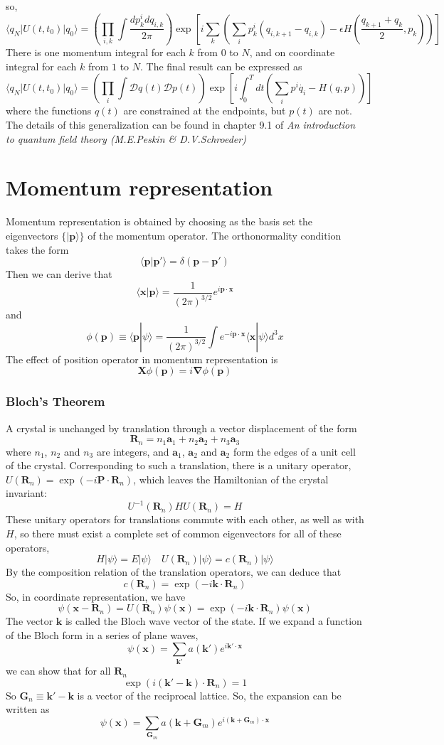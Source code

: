 so,
\[\langle q_{N} | U(t,t_0) | q_{0}\rangle = \left( \prod_{i,k} \int \frac{dp^i_k dq_{i,k}}{2\pi}\right) \exp \left[ i\sum_k \left( \sum_i p_k^i (q_{i,k+1} - q_{i,k})-\epsilon H \left( \frac{q_{k+1}+q_{k}}{2},p_k\right)\right) \right]\]
There is one momentum integral for each $k$ from $0$ to $N$, and on coordinate integral for each $k$ from $1$ to $N$.
The final result can be expressed as
\[\langle q_{N} | U(t,t_0) | q_{0}\rangle = \left( \prod_{i} \int \mathcal{D}q(t) \mathcal{D}p(t) \right) \exp \left[ i \int_0^T dt \left( \sum_i p^i \dot{q_i} - H \left( q,p\right)\right) \right]\]
where the functions $q(t)$ are constrained at the endpoints, but $p(t)$ are not. 
The details of this generalization can be found in  chapter 9.1 of \emph{An introduction to quantum field theory (M.E.Peskin \& D.V.Schroeder)}

\section{Momentum representation}
Momentum representation is obtained by choosing as the basis set the eigenvectors $\{|\bm{p}\rangle\}$ of the momentum operator. The orthonormality condition takes the form
\[\langle \bm{p} | \bm{p}' \rangle = \delta(\bm{p}-\bm{p}')\]
Then we can derive that
\[\langle \bm{x} | \bm{p} \rangle = \frac{1}{(2\pi)^{3/2}} e^{i\bm{p}\cdot\bm{x}}\]
and
\[\phi(\bm{p}) \equiv \langle \bm{p} | \psi \rangle = \frac{1}{(2\pi)^{3/2}} \int e^{-i\bm{p}\cdot\bm{x}} \langle \bm{x} | \psi \rangle d^3 x\]
The effect of position operator in momentum representation is
\[\bm{X}\phi(\bm{p}) = i\bm{\nabla} \phi(\bm{p})\]
\subsubsection{Bloch's Theorem}
A crystal is unchanged by translation through a vector displacement of the form
\[\bm{R}_n = n_1\bm{a}_1 + n_2\bm{a}_2 + n_3\bm{a}_3\]
where $n_1$, $n_2$ and $n_3$ are integers, and $\bm{a}_1$, $\bm{a}_2$ and $\bm{a}_2$ form the edges of a unit cell of the crystal. Corresponding to such a translation, there is a unitary operator, $U(\bm{R}_n) = \exp(-i\bm{P}\cdot \bm{R}_n)$, which leaves the Hamiltonian of the crystal invariant:
\[U^{-1}(\bm{R}_n) H U(\bm{R}_n) = H\]
These unitary operators for translations commute with each other, as well as with $H$, so there must exist a complete set of common eigenvectors for all of these operators,
\[H|\psi\rangle = E|\psi\rangle \quad U(\bm{R}_n)|\psi\rangle = c(\bm{R}_n)|\psi\rangle\]
By the composition relation of the translation operators, we can deduce that
\[c(\bm{R}_n) = \exp(-i\bm{k}\cdot\bm{R}_n)\]
So, in coordinate representation, we have
\[\psi(\bm{x} - \bm{R}_n) = U(\bm{R}_n) \psi(\bm{x}) = \exp(-i\bm{k}\cdot\bm{R}_n) \psi(\bm{x})\]
The vector $\bm{k}$ is called the Bloch wave vector of the state. If we expand a function of the Bloch form in a series of plane waves, 
\[\psi(\bm{x}) = \sum_{\bm{k}'} a(\bm{k}') e^{i\bm{k}'\cdot \bm{x}}\]
we can show that for all $\bm{R}_n$
\[\exp(i(\bm{k}' - \bm{k})\cdot \bm{R}_n) = 1 \]
So $\bm{G}_n \equiv \bm{k}' - \bm{k}$ is a vector of the reciprocal lattice. So, the expansion can be written as
\[\psi(\bm{x}) = \sum_{\bm{G}_m} a(\bm{k} + \bm{G}_m) e^{i(\bm{k} + \bm{G}_m)\cdot\bm{x}}\]

